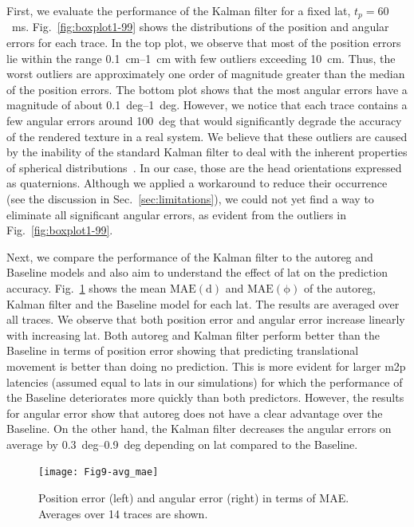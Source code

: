 \documentclass[sigconf]{acmart}			%
\begin{document}
First, we evaluate the performance of the Kalman filter for a fixed \gls{lat}, $t_p=60$~ms.
Fig.~\ref{fig:boxplot1-99} shows the distributions of the position and angular errors for each trace.
In the top plot, we observe that most of the position errors lie within the range \SIrange{0.1}{1}{cm} with few outliers exceeding \SI{10}{cm}.
Thus, the worst outliers are approximately one order of magnitude greater than the median of the position errors.
The bottom plot shows that the most angular errors have a magnitude of about \SIrange{0.1}{1}{deg}.
However, we notice that each trace contains a few angular errors around \SI{100}{deg} that would significantly degrade the accuracy of the rendered texture in a real system.
We believe that these outliers are caused by the inability of the standard Kalman filter to deal with the inherent properties of spherical distributions~\cite{kurz2016}.
In our case, those are the head orientations expressed as quaternions.
Although we applied a workaround to reduce their occurrence (see the discussion in Sec.~\ref{sec:limitations}), we could not yet find a way to eliminate all significant angular errors, as evident from the outliers in Fig.~\ref{fig:boxplot1-99}.

Next, we compare the performance of the Kalman filter to the \gls{autoreg} and Baseline models and also aim to understand the effect of \gls{lat} on the prediction accuracy.
Fig.~\ref{fig:avg_mae} shows the mean $\mathrm{MAE(d)}$ and $\mathrm{MAE(\phi)}$ of the \gls{autoreg}, Kalman filter and the Baseline model for each \gls{lat}. 
The results are averaged over all traces.
We observe that both position error and angular error increase linearly with increasing \gls{lat}.
Both \gls{autoreg} and Kalman filter perform better than the Baseline in terms of position error showing that predicting translational movement is better than doing no prediction.
This is more evident for larger \gls{m2p} latencies (assumed equal to \glspl{lat} in our simulations) for which the performance of the Baseline deteriorates more quickly than both predictors.
However, the results for angular error show that \gls{autoreg} does not have a clear advantage over the Baseline. On the other hand, the Kalman filter decreases the angular errors on average by \SIrange{0.3}{0.9}{deg} depending on \gls{lat} compared to the Baseline.

\begin{figure}[ht]
	\centering
	\texttt{[image: Fig9-avg\_mae]}  
	\caption{Position error (left) and angular error (right) in terms of MAE. Averages over 14 traces are shown.}
	\label{fig:avg_mae}
\end{figure}
\end{document}
